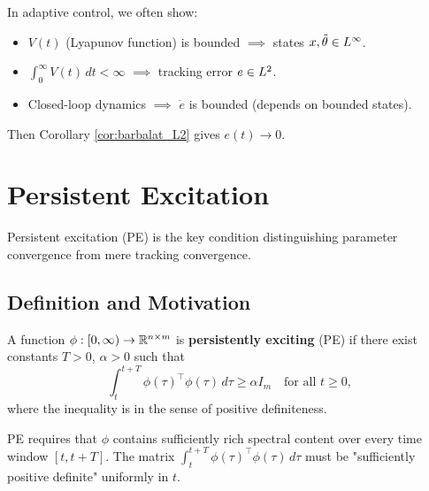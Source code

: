 \begin{remark}
In adaptive control, we often show:
\begin{itemize}
    \item $V(t)$ (Lyapunov function) is bounded $\implies$ states $x, \tilde{\theta} \in L^{\infty}$.
    \item $\int_0^\infty V(t) \, dt < \infty$ $\implies$ tracking error $e \in L^{2}$.
    \item Closed-loop dynamics $\implies$ $\dot{e}$ is bounded (depends on bounded states).
\end{itemize}
Then Corollary \ref{cor:barbalat_L2} gives $e(t) \to 0$.
\end{remark}

\section{Persistent Excitation}

Persistent excitation (PE) is the key condition distinguishing parameter convergence from mere tracking convergence.

\subsection{Definition and Motivation}

\begin{definition}
\label{def:pe}
A function $\phi: [0,\infty) \to \mathbb{R}^{n \times m}$ is \textbf{persistently exciting} (PE) if there exist constants $T > 0$, $\alpha > 0$ such that
\begin{equation}
    \int_t^{t+T} \phi(\tau)^\top \phi(\tau) \, d\tau \geq \alpha I_m \quad \text{for all } t \geq 0,
\end{equation}
where the inequality is in the sense of positive definiteness.
\end{definition}

\begin{remark}[Intuition]
PE requires that $\phi$ contains sufficiently rich spectral content over every time window $[t, t+T]$. The matrix $\int_t^{t+T} \phi(\tau)^\top \phi(\tau) \, d\tau$ must be "sufficiently positive definite" uniformly in $t$.
\end{remark}


